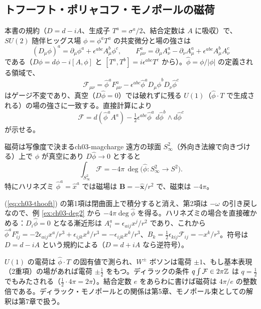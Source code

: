 \subsection{トフーフト・ポリャコフ・モノポールの磁荷}
本書の規約（$D=d-iA$、生成子 $T^a=\sigma^a/2$、結合定数は $A$ に吸収）で、$SU(2)$ 随伴ヒッグス場 $\phi=\phi^aT^a$ の共変微分と場の強さは
\[
(D_\mu\phi)^a=\partial_\mu\phi^a+\epsilon^{abc}A^b_\mu\phi^c,\qquad F^a_{\mu\nu}=\partial_\mu A^a_\nu-\partial_\nu A^a_\mu+\epsilon^{abc}A^b_\mu A^c_\nu
\]
である（$D\phi=d\phi-i[A,\phi]$ と $[T^a,T^b]=i\epsilon^{abc}T^c$ から）。$\hat\phi=\phi/\lvert\phi\rvert$ の定義される領域で、
\[
\mathcal F_{\mu\nu}=\hat\phi^aF^a_{\mu\nu}-\epsilon^{abc}\hat\phi^aD_\mu\hat\phi^bD_\nu\hat\phi^c
\]
はゲージ不変であり、真空（$D\hat\phi=0$）では破れずに残る $U(1)$（$\hat\phi\cdot T$ で生成される）の場の強さに一致する。直接計算により
\begin{equation}
\mathcal F=d(\hat\phi^aA^a)-\tfrac12\epsilon^{abc}\hat\phi^a\,d\hat\phi^b\wedge d\hat\phi^c\label{eq:ch03-thooft}
\end{equation}
が示せる。

\begin{myprop}{磁荷は写像度で決まる}{ch03-magcharge}
遠方の球面 $S^2_\infty$（外向き法線で向きづける）上で $\phi$ が真空にあり $D\hat\phi\to0$ とすると
\[
\int_{S^2_\infty}\mathcal F=-4\pi\,\deg\bigl(\hat\phi\colon S^2_\infty\to S^2\bigr).
\]
特にハリネズミ $\hat\phi^a=\hat x^a$ では磁場は $\bm B=-\hat{\bm x}/r^2$ で、磁束は $-4\pi$。
\end{myprop}
\begin{note}
(\ref{eq:ch03-thooft}) の第1項は閉曲面上で積分すると消え、第2項は $-\omega$ の引き戻しなので、例 \ref{ex:ch03-deg2} から $-4\pi\deg\hat\phi$ を得る。ハリネズミの場合を直接確かめる：$D_i\hat\phi=0$ となる漸近形は $A^a_i=\epsilon_{aij}x^j/r^2$ であり、これから $\hat\phi^aF^a_{ij}=-2\epsilon_{aij}x^a/r^3+\epsilon_{ijk}x^k/r^3=-\epsilon_{ijk}x^k/r^3$、$B_k=\tfrac12\epsilon_{kij}\mathcal F_{ij}=-x^k/r^3$。符号は $D=d-iA$ という規約による（$D=d+iA$ なら逆符号）。
\end{note}
$U(1)$ の電荷は $\hat\phi\cdot T$ の固有値で測られ、$W^\pm$ ボソンは電荷 $\pm1$、もし基本表現（2重項）の場があれば電荷 $\pm\tfrac12$ をもつ。ディラックの条件 $q\int\mathcal F\in2\pi\mathbb{Z}$ は $q=\tfrac12$ でもみたされる（$\tfrac12\cdot4\pi=2\pi$）。結合定数 $e$ をあらわに書けば磁荷は $4\pi/e$ の整数倍である。ディラック・モノポールとの関係は第5章、モノポール束としての解釈は第7章で扱う。

